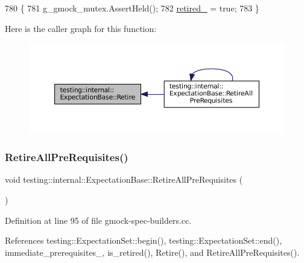 \begin{DoxyCode}
780                                                     \{
781     g\_gmock\_mutex.AssertHeld();
782     \hyperlink{classtesting_1_1internal_1_1ExpectationBase_a0afd852f5d7863effc3d304dac6a44cf}{retired\_} = \textcolor{keyword}{true};
783   \}
\end{DoxyCode}
Here is the caller graph for this function\+:
\nopagebreak
\begin{figure}[H]
\begin{center}
\leavevmode
\includegraphics[width=350pt]{classtesting_1_1internal_1_1ExpectationBase_a0aeeb4c1e66c2f2aa0853c267ad3e781_icgraph}
\end{center}
\end{figure}
\mbox{\label{classtesting_1_1internal_1_1ExpectationBase_afb623801e8de31fcd7b352e200649f7d}} 
\subsubsection{\texorpdfstring{Retire\+All\+Pre\+Requisites()}{RetireAllPreRequisites()}}
{\footnotesize\ttfamily void testing\+::internal\+::\+Expectation\+Base\+::\+Retire\+All\+Pre\+Requisites (\begin{DoxyParamCaption}{ }\end{DoxyParamCaption})\hspace{0.3cm}{\ttfamily [protected]}}



Definition at line 95 of file gmock-\/spec-\/builders.\+cc.



References testing\+::\+Expectation\+Set\+::begin(), testing\+::\+Expectation\+Set\+::end(), immediate\+\_\+prerequisites\+\_\+, is\+\_\+retired(), Retire(), and Retire\+All\+Pre\+Requisites().



